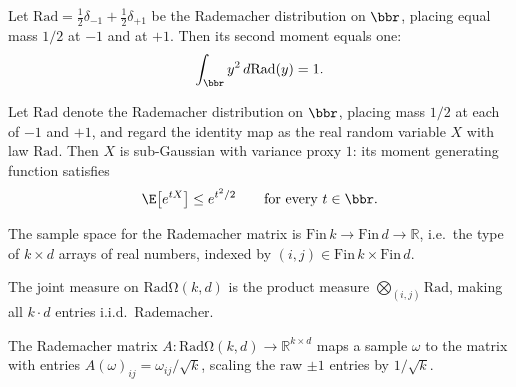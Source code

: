 \begin{lemma}
\label{integral_sq_rademacherReal}
\leanok
{}
Let $\mathrm{Rad} = \tfrac{1}{2}\delta_{-1} + \tfrac{1}{2}\delta_{+1}$ be the Rademacher
distribution on $\bbr$, placing equal mass $1/2$ at $-1$ and at $+1$. Then its second
moment equals one:
\[
\int_{\bbr} y^2 \, d\mathrm{Rad}(y) = 1.
\]
\end{lemma}

\begin{lemma}
\label{hasSubgaussianMGF_id_rademacherReal}
\leanok
{}
Let $\mathrm{Rad}$ denote the Rademacher distribution on $\bbr$, placing mass $1/2$ at
each of $-1$ and $+1$, and regard the identity map as the real random variable $X$ with
law $\mathrm{Rad}$. Then $X$ is sub-Gaussian with variance proxy $1$: its moment
generating function satisfies
\[
\E\!\left[e^{tX}\right] \le e^{t^{2}/2} \qquad \text{for every } t \in \bbr.
\]
\end{lemma}

\begin{definition}
\label{RadΩ}
\leanok
The sample space for the Rademacher matrix is $\mathrm{Fin}\,k \to
\mathrm{Fin}\,d \to \mathbb{R}$, i.e.\ the type of $k \times d$ arrays of
real numbers, indexed by $(i,j) \in \mathrm{Fin}\,k \times \mathrm{Fin}\,d$.
\end{definition}

\begin{definition}
\label{radJointMeasure}
\leanok
{}
The joint measure on $\mathrm{Rad\Omega}(k,d)$ is the product measure
$\bigotimes_{(i,j)} \mathrm{Rad}$, making all $k \cdot d$ entries i.i.d.\
Rademacher.
\end{definition}

\begin{definition}
\label{radMatrix}
\leanok
{}
The Rademacher matrix $A : \mathrm{Rad\Omega}(k,d) \to \mathbb{R}^{k\times d}$
maps a sample $\omega$ to the matrix with entries
$A(\omega)_{ij} = \omega_{ij}/\sqrt{k}$, scaling the raw $\pm 1$ entries by
$1/\sqrt{k}$.
\end{definition}

